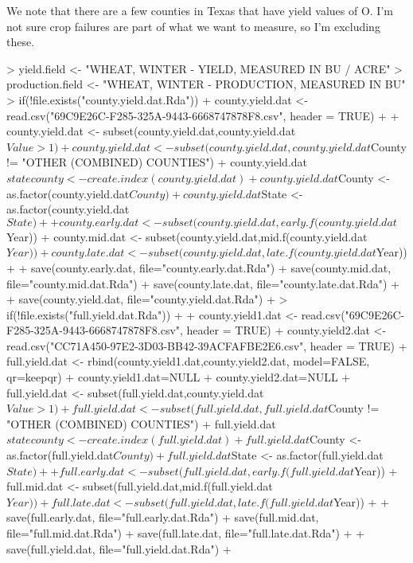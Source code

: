 \documentclass{report}
\begin{document}
We note that there are a few counties in Texas that have yield values of O. I'm not sure crop failures are part of what we want to measure, so I'm excluding these.
\begin{Schunk}
\begin{Sinput}
> yield.field <- "WHEAT, WINTER - YIELD, MEASURED IN BU / ACRE"
> production.field <- "WHEAT, WINTER - PRODUCTION, MEASURED IN BU"
> if(!file.exists("county.yield.dat.Rda")) {
+    county.yield.dat <- read.csv("69C9E26C-F285-325A-9443-6668747878F8.csv", header = TRUE)
+    
+    county.yield.dat <- subset(county.yield.dat,county.yield.dat$Value>1)
+    county.yield.dat <- subset(county.yield.dat, county.yield.dat$County != "OTHER (COMBINED) COUNTIES")
+    county.yield.dat$statecounty <- create.index(county.yield.dat)
+    county.yield.dat$County <- as.factor(county.yield.dat$County)
+    county.yield.dat$State <- as.factor(county.yield.dat$State)
+ 
+    county.early.dat <- subset(county.yield.dat,early.f(county.yield.dat$Year))
+    county.mid.dat <- subset(county.yield.dat,mid.f(county.yield.dat$Year))
+    county.late.dat <- subset(county.yield.dat,late.f(county.yield.dat$Year))
+    
+    save(county.early.dat, file="county.early.dat.Rda")
+    save(county.mid.dat, file="county.mid.dat.Rda")
+    save(county.late.dat, file="county.late.dat.Rda")
+    
+    save(county.yield.dat, file="county.yield.dat.Rda")
+ }
> if(!file.exists("full.yield.dat.Rda")) {
+    
+    county.yield1.dat <- read.csv("69C9E26C-F285-325A-9443-6668747878F8.csv", header = TRUE)
+    county.yield2.dat <- read.csv("CC71A450-97E2-3D03-BB42-39ACFAFBE2E6.csv", header = TRUE)
+    full.yield.dat <- rbind(county.yield1.dat,county.yield2.dat, model=FALSE, qr=keepqr)
+    county.yield1.dat=NULL
+    county.yield2.dat=NULL
+    full.yield.dat <- subset(full.yield.dat,county.yield.dat$Value>1)
+    full.yield.dat <- subset(full.yield.dat, full.yield.dat$County != "OTHER (COMBINED) COUNTIES")
+    full.yield.dat$statecounty <- create.index(full.yield.dat)
+    full.yield.dat$County <- as.factor(full.yield.dat$County)
+    full.yield.dat$State <- as.factor(full.yield.dat$State)
+ 
+    full.early.dat <- subset(full.yield.dat,early.f(full.yield.dat$Year))
+    full.mid.dat <- subset(full.yield.dat,mid.f(full.yield.dat$Year))
+    full.late.dat <- subset(full.yield.dat,late.f(full.yield.dat$Year))
+    
+    save(full.early.dat, file="full.early.dat.Rda")
+    save(full.mid.dat, file="full.mid.dat.Rda")
+    save(full.late.dat, file="full.late.dat.Rda")
+    
+    save(full.yield.dat, file="full.yield.dat.Rda")
+ }
\end{Sinput}
\end{Schunk}
\end{document}
